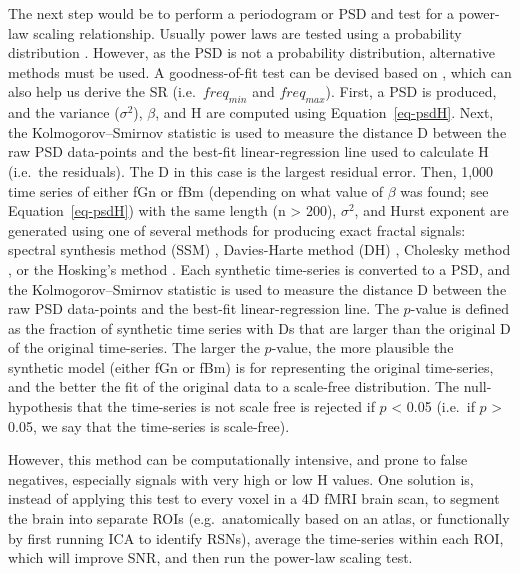 \documentclass[
  sn-vancouver,
  Numbered,
  referee,
  lineno]{sn-jnl}
\begin{document}
The next step would be to perform a periodogram or PSD and test for a
power-law scaling relationship. Usually power laws are tested using a
probability distribution
\citep{clausetPowerLawDistributionsEmpirical2009}. However, as the PSD
is not a probability distribution, alternative methods must be used. A
goodness-of-fit test can be devised based on
\citet{clausetPowerLawDistributionsEmpirical2009}, which can also help
us derive the SR (i.e.~\(freq_{min}\) and \(freq_{max}\)). First, a PSD
is produced, and the variance (\(\sigma^2\)), \(\beta\), and H are
computed using Equation~\ref{eq-psdH}. Next, the Kolmogorov--Smirnov
statistic
\citep{kolmogorovSullaDeterminazioneEmpirica1933, smirnovTableEstimatingGoodness1948}
is used to measure the distance D between the raw PSD data-points and
the best-fit linear-regression line used to calculate H (i.e.~the
residuals). The D in this case is the largest residual error. Then,
1,000 time series of either fGn or fBm (depending on what value of
\(\beta\) was found; see Equation~\ref{eq-psdH}) with the same length (n
\textgreater{} 200), \(\sigma^2\), and Hurst exponent are generated
using one of several methods for producing exact fractal signals:
spectral synthesis method (SSM) \citep{peitgenScienceFractalImages1988},
Davies-Harte method (DH) \citep{daviesTestsHurstEffect1987}, Cholesky
method \citep{asmussenStochasticSimulationView1998}, or the Hosking's
method \citep{hoskingModelingPersistenceHydrological1984}. Each
synthetic time-series is converted to a PSD, and the Kolmogorov--Smirnov
statistic is used to measure the distance D between the raw PSD
data-points and the best-fit linear-regression line. The \(p\)-value is
defined as the fraction of synthetic time series with Ds that are larger
than the original D of the original time-series. The larger the
\(p\)-value, the more plausible the synthetic model (either fGn or fBm)
is for representing the original time-series, and the better the fit of
the original data to a scale-free distribution. The null-hypothesis that
the time-series is not scale free is rejected if \(p\) \textless{} 0.05
(i.e.~if \(p\) \textgreater{} 0.05, we say that the time-series is
scale-free).

However, this method can be computationally intensive, and prone to
false negatives, especially signals with very high or low H values. One
solution is, instead of applying this test to every voxel in a 4D fMRI
brain scan, to segment the brain into separate ROIs (e.g.~anatomically
based on an atlas, or functionally by first running ICA to identify
RSNs), average the time-series within each ROI, which will improve SNR,
and then run the power-law scaling test.
\end{document}
